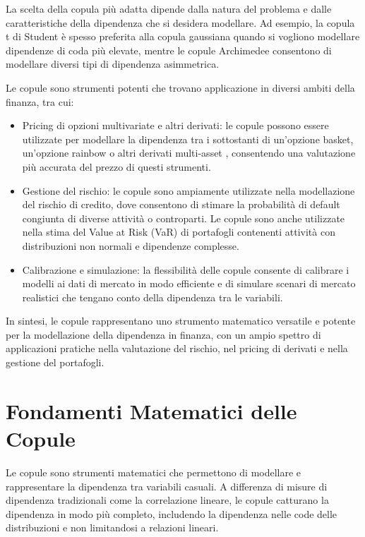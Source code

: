 \documentclass[a4paper,12pt]{article}
\begin{document}
\noindent La scelta della copula più adatta dipende dalla natura del problema e dalle caratteristiche della dipendenza che si desidera modellare. Ad esempio, la copula t di Student è spesso preferita alla copula gaussiana quando si vogliono modellare dipendenze di coda più elevate, mentre le copule Archimedee consentono di modellare diversi tipi di dipendenza asimmetrica.

\noindent Le copule sono strumenti potenti che trovano applicazione in diversi ambiti della finanza, tra cui:

\begin{itemize}
	\item Pricing di opzioni multivariate e altri derivati: le copule possono essere utilizzate per modellare la dipendenza tra i sottostanti di un'opzione basket, un'opzione rainbow o altri derivati multi-asset
	, consentendo una valutazione più accurata del prezzo di questi strumenti.
	\item Gestione del rischio: le copule sono ampiamente utilizzate nella modellazione del rischio di credito, dove consentono di stimare la probabilità di default congiunta di diverse attività o controparti. Le copule sono anche utilizzate nella stima del Value at Risk (VaR) di portafogli contenenti attività con distribuzioni non normali e dipendenze complesse.
	\item Calibrazione e simulazione: la flessibilità delle copule consente di calibrare i modelli ai dati di mercato in modo efficiente e di simulare scenari di mercato realistici che tengano conto della dipendenza tra le variabili.
\end{itemize}


\noindent In sintesi, le copule rappresentano uno strumento matematico versatile e potente per la modellazione della dipendenza in finanza, con un ampio spettro di applicazioni pratiche nella valutazione del rischio, nel pricing di derivati e nella gestione del portafogli.

\section*{\textbf{Fondamenti Matematici delle Copule}}

Le copule sono strumenti matematici che permettono di modellare e rappresentare la dipendenza tra variabili casuali. A differenza di misure di dipendenza tradizionali come la correlazione lineare, le copule catturano la dipendenza in modo più completo, includendo la dipendenza nelle code delle distribuzioni e non limitandosi a relazioni lineari.
\end{document}
